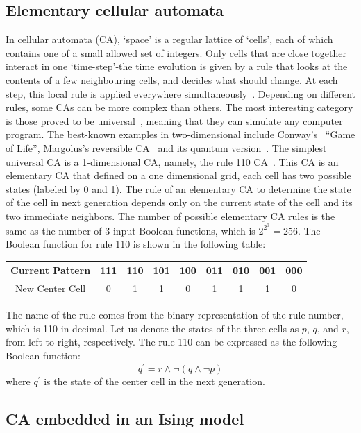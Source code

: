 \documentclass[twocolumn,superscriptaddress,english,showpacs,longbibliography]{revtex4-2}
\begin{document}
\subsection{Elementary cellular automata}\label{elementary-cellular-automata}
In cellular automata (CA), `space' is a regular lattice of `cells', each of which contains one of a small allowed set of integers.
Only cells that are close together interact in one `time-step'-the time evolution is given by a rule that looks at the contents of a few neighbouring cells, and decides what should change. At each step, this local rule is applied everywhere simultaneously~\cite{}.
Depending on different rules, some CAs can be more complex than others.
The most interesting category is those proved to be universal~\cite{Berlekamp2004}, meaning that they can simulate any computer program. The best-known examples in two-dimensional include Conway's~\cite{Games1970} ``Game of Life'', Margolus's reversible CA~\cite{Margolus1984} and its quantum version~\cite{Arrighi2012}.
The simplest universal CA is a 1-dimensional CA, namely, the rule 110 CA~\cite{Cook2009}.
This CA is an elementary CA that defined on a one dimensional grid, each cell has two possible states (labeled by 0 and 1). The rule of an elementary CA to determine the state of the cell in next generation depends only on the current state of the cell and its two immediate neighbors. The number of possible elementary CA rules is the same as the number of 3-input Boolean functions, which is $2^{2^3} = 256$. The Boolean function for rule 110 is shown in the following table:

\begin{tabular}{|c|c|c|c|c|c|c|c|c|}
\hline
Current Pattern & 111 & 110 & 101 & 100 & 011 & 010 & 001 & 000 \\
\hline
New Center Cell & 0 & 1 & 1 & 0 & 1 & 1 & 1 & 0 \\
\hline
\end{tabular}

The name of the rule comes from the binary representation of the rule number, which is 110 in decimal.
Let us denote the states of the three cells as $p$, $q$, and $r$, from left to right, respectively. The rule 110 can be expressed as the following Boolean function:
\begin{equation}\label{eq:110rule}
    q^\prime = r \land \neg (q \land \neg p)
\end{equation}
where $q^\prime$ is the state of the center cell in the next generation.

\subsection{CA embedded in an Ising model}
\end{document}
